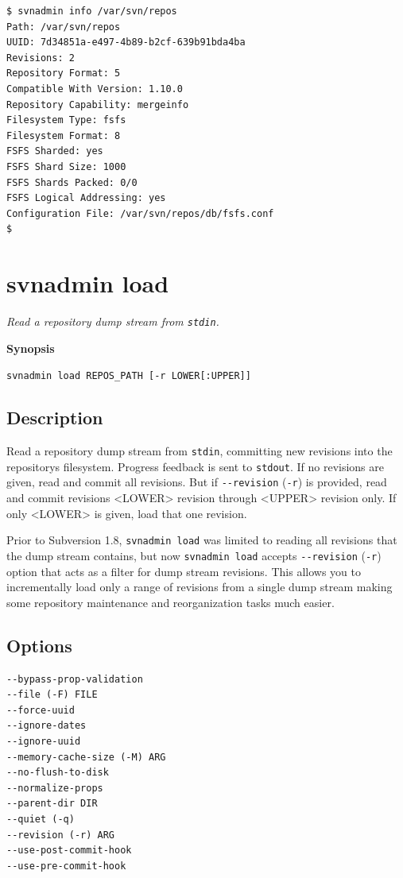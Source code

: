 \begin{verbatim}
$ svnadmin info /var/svn/repos
Path: /var/svn/repos
UUID: 7d34851a-e497-4b89-b2cf-639b91bda4ba
Revisions: 2
Repository Format: 5
Compatible With Version: 1.10.0
Repository Capability: mergeinfo
Filesystem Type: fsfs
Filesystem Format: 8
FSFS Sharded: yes
FSFS Shard Size: 1000
FSFS Shards Packed: 0/0
FSFS Logical Addressing: yes
Configuration File: /var/svn/repos/db/fsfs.conf
$
\end{verbatim}

\section{svnadmin load}\label{svn.ref.svnadmin.c.load}

\emph{Read a repository dump stream from \texttt{stdin}.}

\textbf{Synopsis}

\texttt{svnadmin\ load\ REPOS\_PATH\ {[}-r\ LOWER{[}:UPPER{]}{]}}

\subsection{Description}

Read a repository dump stream from \texttt{stdin}, committing new
revisions into the repository\textquotesingle s filesystem. Progress
feedback is sent to \texttt{stdout}. If no revisions are given, read and
commit all revisions. But if \texttt{-\/-revision} (\texttt{-r}) is
provided, read and commit revisions \textless LOWER\textgreater{}
revision through \textless UPPER\textgreater{} revision only. If only
\textless LOWER\textgreater{} is given, load that one revision.

Prior to Subversion 1.8, \texttt{svnadmin\ load} was limited to reading
all revisions that the dump stream contains, but now
\texttt{svnadmin\ load} accepts \texttt{-\/-revision} (\texttt{-r})
option that acts as a filter for dump stream revisions. This allows you
to incrementally load only a range of revisions from a single dump
stream making some repository maintenance and reorganization tasks much
easier.

\subsection{Options}

\begin{verbatim}
--bypass-prop-validation
--file (-F) FILE
--force-uuid
--ignore-dates
--ignore-uuid
--memory-cache-size (-M) ARG
--no-flush-to-disk
--normalize-props
--parent-dir DIR
--quiet (-q)
--revision (-r) ARG
--use-post-commit-hook
--use-pre-commit-hook
\end{verbatim}

